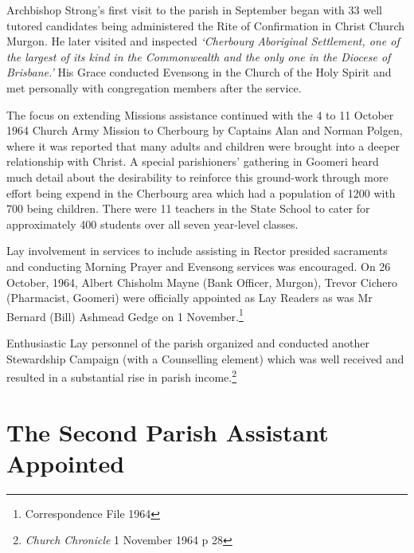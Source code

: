 Archbishop Strong's first visit to the parish in September began with 33 well tutored candidates being administered the Rite of Confirmation in Christ Church Murgon. He later visited and inspected \emph{`Cherbourg Aboriginal Settlement, one of the largest of its kind in the Commonwealth and the only one in the Diocese of Brisbane.'} His Grace conducted Evensong in the Church of the Holy Spirit and met personally with congregation members after the service.



The focus on extending Missions assistance continued with the 4 to 11 October 1964 Church Army Mission to Cherbourg by Captains Alan and Norman Polgen, where it was reported that many adults and children were brought into a deeper relationship with Christ. A special parishioners' gathering in Goomeri heard much detail about the desirability to reinforce this ground-work through more effort being expend in the Cherbourg area which had a population of 1200 with 700 being children. There were 11 teachers in the State School to cater for approximately 400 students over all seven year-level classes.



Lay involvement in services to include assisting in Rector presided sacraments and conducting Morning Prayer and Evensong services was encouraged. On 26 October, 1964, Albert Chisholm Mayne (Bank Officer, Murgon), Trevor Cichero (Pharmacist, Goomeri) were officially appointed as Lay Readers as was Mr Bernard (Bill) Ashmead Gedge on 1 November.\footnote{Correspondence File 1964}


Enthusiastic Lay personnel of the parish organized and conducted another Stewardship Campaign (with a Counselling element) which was well received and resulted in a substantial rise in parish income.\footnote{\emph{Church Chronicle} 1 November 1964 p 28}


\section{The Second Parish Assistant Appointed}









